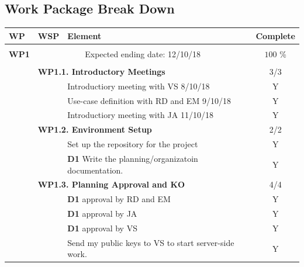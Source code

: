 \documentclass{article}
\newcommand{\lline}[1]{\hline\multicolumn{#1}{c}{}\\[-1.34em]\hline}
\begin{document}
\subsection{Work Package Break Down}
\begin{longtable}{lm{5cm}m{7cm}c}
\hline
\textbf{WP} & \textbf{WSP} & \textbf{Element} & \textbf{Complete} \\[3pt] \lline{4}
\textbf{WP1} & \multicolumn{2}{c}{Expected ending date: 12/10/18} & $100$ \% \\[3pt] \lline{4} %
& \multicolumn{2}{l}{\textbf{WP1.1. Introductory Meetings}} & 3/3 \\[3pt] \hline
& & Introductiory meeting with VS 8/10/18 & Y \\[3pt]
& & Use-case definition with RD and EM 9/10/18 & Y \\[3pt]
& & Introductiory meeting with JA 11/10/18 & Y \\[3pt] \hline
& \multicolumn{2}{l}{\textbf{WP1.2. Environment Setup}} & 2/2 \\[3pt] \hline
& & Set up the repository for the project & Y \\[3pt]
& & \textbf{D1} Write the planning/organizatoin documentation. & Y \\[3pt] \hline
& \multicolumn{2}{l}{\textbf{WP1.3. Planning Approval and KO}} & 4/4 \\[3pt] \hline
& & \textbf{D1} approval by RD and EM & Y \\[3pt]
& & \textbf{D1} approval by JA & Y \\[3pt]
& & \textbf{D1} approval by VS & Y \\[3pt]
& & Send my public keys to VS to start server-side work. & Y \\[6pt] \hline


\end{longtable}
\end{document}
